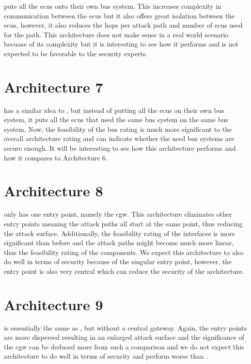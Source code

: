  puts all the \gls{ecu}s onto their own bus system. 
This increases complexity in communication between the \gls{ecu}s but it also offers great isolation between the \gls{ecu}s, 
however, it also reduces the hops per attack path and number of \gls{ecu}s used for the path.
This architecture does not make sense in a real world scenario becuase of its complexity but it is interesting to see how it performs
and is not expected to be favorable to the security experts.

\section{Architecture 7}
\label{subsec:arch7}

 has a similar idea to ,
but instead of putting all the \gls{ecu}s on their own bus system, it puts all the \gls{ecu}s that used the same bus system on the same bus system. 
Now, the feasibility of the bus rating is much more significant to the overall architecture rating and can indicate whether the used bus systems are secure enough.
It will be interesting to see how this architecture performs and how it compares to Architecture 6.

\section{Architecture 8}
\label{subsec:arch8}

 only has one entry point, namely the \gls{cgw}.
This architecture eliminates other entry points meaning the attack paths all start at the same point, thus reducing the attack surface. 
Additionally, the feasibility rating of the interfaces is more significant than before and the attack paths might become much more linear, 
thus the feasibility rating of the components.
We expect this architecture to also do well in terms of security because of the singular entry point, 
however, the entry point is also very central which can reduce the security of the architecture.

\section{Architecture 9}
\label{subsec:arch9}

 is essentially the same as ,
but without a central gateway. Again, the entry points are more dispersed resulting in an enlarged attack surface 
and the significance of the \gls{cgw} can be deduced more from such a comparison 
and we do not expect this architecture to do well in terms of security and perform worse than . 

